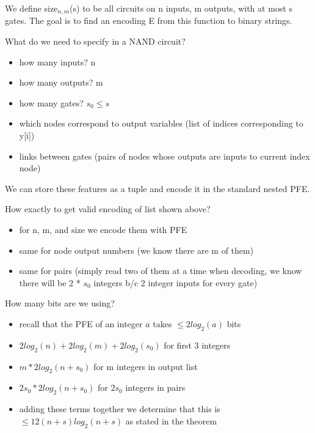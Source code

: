 {
    We define size$_{n, m}$(s) to be all circuits on n inputs, m outputs, with at most s gates. The goal is to find an encoding E from this function to binary strings.

    What do we need to specify in a NAND circuit?
    \begin{itemize}
        \item how many inputs? n
        \item how many outputs? m
        \item how many gates? $s_0 \le s$
        \item which nodes correspond to output variables (list of indices corresponding to y[i])
        \item links between gates (pairs of nodes whose outputs are inputs to current index node)
    \end{itemize}

    We can store these features as a tuple and encode it in the standard nested PFE.

    \begin{example}
        \begin{center}
        \end{center}
    How exactly to get valid encoding of list shown above?
    \begin{itemize}
        \item for n, m, and size we encode them with PFE
        \item same for node output numbers (we know there are m of them)
        \item same for pairs (simply read two of them at a time when decoding, we know there will be 2 * $s_0$ integers b/c 2 integer inputs for every gate)
    \end{itemize}

    How many bits are we using?
    \begin{itemize}
        \item recall that the PFE of an integer $a$ takes $\le 2log_2(a)$ bits
        \item $2log_2(n) + 2log_2(m) + 2 log_2(s_0)$ for first 3 integers
        \item $m * 2log_2(n + s_0)$ for m integers in output list
        \item $2s_0 * 2log_2(n + s_0)$ for $2s_0$ integers in pairs
        \item adding these terms together we determine that this is $\le 12(n+s)log_2(n+s)$ as stated in the theorem
    \end{itemize}
    \end{example}

    
}

